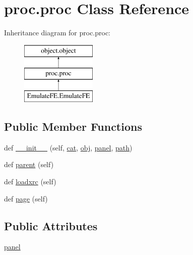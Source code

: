 \hypertarget{classproc_1_1proc}{}\section{proc.\+proc Class Reference}
\label{classproc_1_1proc}
Inheritance diagram for proc.\+proc\+:\begin{figure}[H]
\begin{center}
\leavevmode
\includegraphics[height=3.000000cm]{classproc_1_1proc}
\end{center}
\end{figure}
\subsection*{Public Member Functions}
\begin{DoxyCompactItemize}
\item 
def \hyperlink{classproc_1_1proc_ab5b9673d3e2e83cf26267f39055153f3}{\+\_\+\+\_\+init\+\_\+\+\_\+} (self, \hyperlink{classobject_1_1object_af114388a80cca208c152ffeca0e89e23}{cat}, \hyperlink{classobject_1_1object_a82b61e7cd7e18b1f9de10fc832e5b75e}{obj}, \hyperlink{classproc_1_1proc_a36068ce6d978f4f4dde164e7bdc2e057}{panel}, \hyperlink{classobject_1_1object_a2a518f960961d791b0f900a90c3cd287}{path})
\item 
def \hyperlink{classproc_1_1proc_a997ae1c4cc88dfe9e361897bf471ca0f}{parent} (self)
\item 
def \hyperlink{classproc_1_1proc_a7acf16dcc37aaf46cc783a382ae6bd82}{loadxrc} (self)
\item 
def \hyperlink{classproc_1_1proc_a41bdd5dd3af283e3f0053c1a0c7fa7bf}{page} (self)
\end{DoxyCompactItemize}
\subsection*{Public Attributes}
\begin{DoxyCompactItemize}
\item 
\hyperlink{classproc_1_1proc_a36068ce6d978f4f4dde164e7bdc2e057}{panel}
\end{DoxyCompactItemize}



